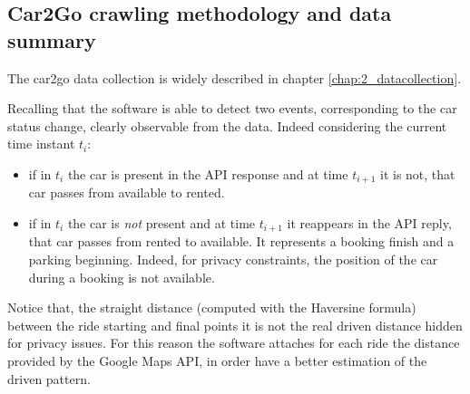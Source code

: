 \subsection{Car2Go crawling methodology and data summary}
\label{ss:4_5_datacollect}
 
The car2go data collection is widely described in chapter \ref{chap:2_datacollection}. 

Recalling that the software is able to detect two events, corresponding to the car status change, clearly observable from the data. Indeed considering the current time instant $t_i$: 
\begin{itemize}
     \item if in $t_i$ the car is present in the API response and at time $t_{i+1}$ it is not, that car passes from available to rented. %
     \item if in $t_i$ the car is \emph{not} present and at time $t_{i+1}$ it reappears in the API reply, that car passes from rented  to available. It represents a booking finish and a parking beginning.  Indeed, for privacy constraints, the position of the car during a booking is not available.
\end{itemize}

Notice that, the straight distance (computed with the Haversine formula) between the ride starting and final points it is not the real driven distance hidden for privacy issues. For this reason the software attaches for each ride the distance provided by the Google Maps API, in order have a better estimation of the driven pattern. 

